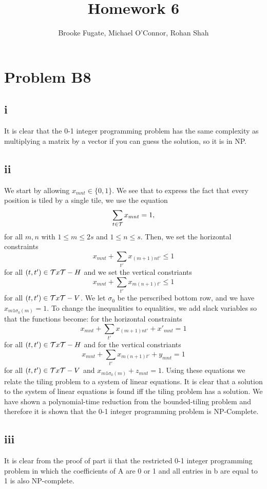 \documentclass[12pt]{article}
\begin{document}
\pagestyle{plain}
\titleformat{\subsection}[runin]
  {\normalfont\large\bfseries}{\thesubsection}{1em}{}
\titleformat{\subsubsection}[runin]
  {\bfseries}{}{1em}{}

\title{Homework 6}
\author{Brooke Fugate, Michael O'Connor, Rohan Shah}
\date{}

\maketitle

\section*{Problem B8}
\subsection*{i}
It is clear that the 0-1 integer programming problem has the same complexity as multiplying a matrix by a vector if you can guess the solution, so it is in NP.

\subsection*{ii}
We start by allowing $x_{mnt} \in \{0,1\}$.  We see that to express the fact that every position is tiled by a
single tile, we use the equation
\[
\sum_{t\in {\cal T}} x_{m n t} = 1,
\]
for all $m, n$ with $1 \leq m \leq 2 s$ and $1 \leq n \leq s$.
Then, we set the horizontal constraints 
\[
x_{mnt} + \sum_{t'} x_{(m+1) n t'} \le 1
\] 
for all $(t,t') \in {\cal T} x {\cal T} - H$ and we set the vertical constriants 
\[
x_{mnt} + \sum_{t'} x_{m (n+1) t'} \le 1
\] 
for all $(t,t') \in {\cal T} x {\cal T} - V$.  We let $\sigma_0$ be the perscribed bottom row, and we have $x_{m1\sigma_0 (m)} = 1$. To change the inequalities to equalities, we add slack variables so that the functions become: for the horizontal constraints
\[
x_{mnt} + \sum_{t'} x_{(m+1) n t'} + x'_{mnt} = 1
\]
for all $(t,t') \in {\cal T} x {\cal T} - H$ and for the vertical constriants
\[
x_{mnt} + \sum_{t'} x_{m (n+1) t'} + y_{mnt}  = 1
\]
for all $(t,t') \in {\cal T} x {\cal T} - V$ and $x_{m1\sigma_0 (m)} + z_{mnt} = 1$.
Using these equations we relate the tiling problem to a system of linear equations.  It is clear that a solution to the system of linear equations is found iff the tiling problem has a solution. We have shown a polynomial-time reduction from the bounded-tiling problem and therefore it is shown that the 0-1 integer programming problem is NP-Complete.  

\subsection*{iii}
It is clear from the proof of part ii that the restricted 0-1 integer programming problem in which the coefficients of A are 0 or 1 and all entries in b are equal to 1 is also NP-complete.
\end{document}
